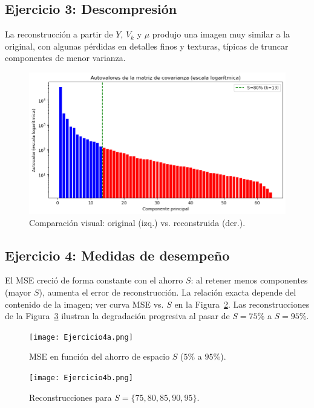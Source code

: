 \documentclass[12pt]{article}
\begin{document}
\subsection{Ejercicio 3: Descompresión}
La reconstrucción a partir de \(Y\), \(V_k\) y \(\mu\) produjo una imagen muy similar a la original, con algunas pérdidas en detalles finos y texturas, típicas de truncar componentes de menor varianza.

\begin{figure}[h!]
    \centering
    \includegraphics[width=\textwidth]{Ejercicio3.png}
    \caption{Comparación visual: original (izq.) vs. reconstruida (der.).}
    \label{fig:ej3}
\end{figure}

\subsection{Ejercicio 4: Medidas de desempeño}
El MSE creció de forma constante con el ahorro \(S\): al retener menos componentes (mayor \(S\)), aumenta el error de reconstrucción. La relación exacta depende del contenido de la imagen; ver curva MSE vs. \(S\) en la Figura~\ref{fig:mse}. Las reconstrucciones de la Figura~\ref{fig:ej4b} ilustran la degradación progresiva al pasar de \(S=75\%\) a \(S=95\%\).

\begin{figure}[h!]
    \centering
    \texttt{[image: Ejercicio4a.png]}
    \caption{MSE en función del ahorro de espacio \(S\) (\(5\%\) a \(95\%\)).}
    \label{fig:mse}
\end{figure}

\begin{figure}[h!]
    \centering
    \texttt{[image: Ejercicio4b.png]}
    \caption{Reconstrucciones para \(S=\{75,80,85,90,95\}\).}
    \label{fig:ej4b}
\end{figure}
\end{document}
